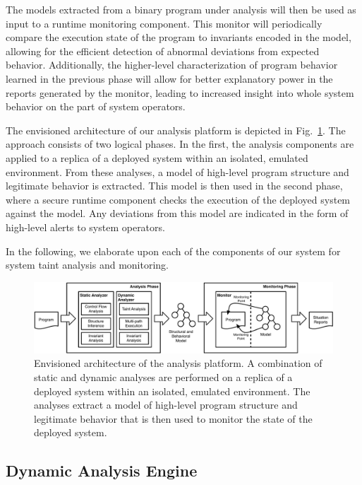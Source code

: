 \documentclass[letterpaper,twoside,11pt,headings=small]{scrartcl}
\begin{document}
The models extracted from a binary program under analysis will then be used as
input to a runtime monitoring component.  This monitor will periodically
compare the execution state of the program to invariants encoded in the model,
allowing for the efficient detection of abnormal deviations from expected
behavior.  Additionally, the higher-level characterization of program behavior
learned in the previous phase will allow for better explanatory power in the
reports generated by the monitor, leading to increased insight into whole
system behavior on the part of system operators.

The envisioned architecture of our analysis platform is depicted in
Fig.~\ref{fig:decomposition-arch}.  The approach consists of two logical
phases.  In the first, the analysis components are applied to a replica of a
deployed system within an isolated, emulated environment.  From these
analyses, a model of high-level program structure and legitimate behavior is
extracted.  This model is then used in the second phase, where a secure
runtime component checks the execution of the deployed system against the
model.  Any deviations from this model are indicated in the form of high-level
alerts to system operators.

In the following, we elaborate upon each of the components of our system for
system taint analysis and monitoring.

\begin{figure}[t]
    \centering
    \includegraphics[width=\textwidth]{figures/system-invariants-arch.pdf}
    \caption{Envisioned architecture of the analysis platform.
    A combination of static and dynamic analyses are performed on a replica
    of a deployed system within an isolated, emulated environment.
    The analyses extract a model of high-level program structure and
    legitimate behavior that is then used to monitor the state of the
    deployed system.}
    \label{fig:decomposition-arch}
\end{figure}

\subsection{Dynamic Analysis Engine}
\end{document}

